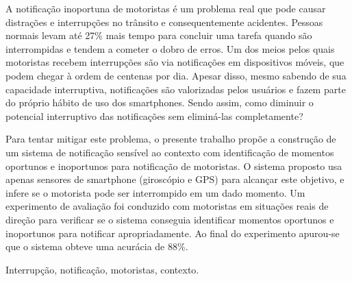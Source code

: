A notificação inoportuna de motoristas é um problema real que pode causar distrações e interrupções no trânsito e
consequentemente acidentes. Pessoas normais levam até 27\% mais tempo para concluir uma tarefa quando são interrompidas
e tendem a cometer o dobro de erros. Um dos meios pelos quais motoristas recebem interrupções são via notificações
em dispositivos móveis, que podem chegar à ordem de centenas por dia. Apesar disso, mesmo sabendo de sua capacidade
interruptiva, notificações são valorizadas pelos usuários e fazem parte do próprio hábito de uso dos smartphones.
Sendo assim, como diminuir o potencial interruptivo das notificações sem eliminá-las completamente?

Para tentar mitigar este problema, o presente trabalho propõe a construção de um sistema de notificação sensível ao
contexto com identificação de momentos oportunos e inoportunos para notificação de motoristas. O sistema proposto usa
apenas sensores de smartphone (giroscópio e GPS) para alcançar este objetivo, e infere se o motorista pode ser
interrompido em um dado momento. Um experimento de avaliação foi conduzido com motoristas em situações reais de direção
para verificar se o sistema conseguia identificar momentos oportunos e inoportunos para notificar apropriadamente. Ao
final do experimento apurou-se que o sistema obteve uma acurácia de 88\%.

\begin{keywords}
Interrupção, notificação, motoristas, contexto.
\end{keywords}
